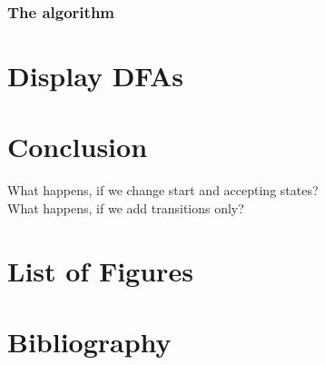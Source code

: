 \documentclass[a4paper, oneside, 11pt]{report}
\theoremstyle{definition}
\theoremstyle{remark}
\begin{document}
\subsection{The algorithm}




\chapter{Display DFAs}




\chapter{Conclusion}

What happens, if we change start and accepting states? \\
What happens, if we add transitions only?


\appendix
\chapter{List of Figures}
\chapter{Bibliography}
\end{document}
